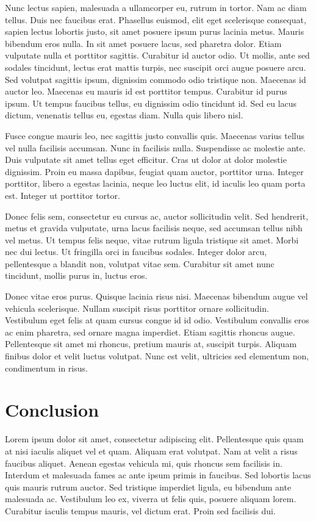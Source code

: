 \documentclass{UoYCSproject}
\begin{document}
Nunc lectus sapien, malesuada a ullamcorper eu, rutrum in tortor. Nam ac diam tellus. Duis nec faucibus erat. Phasellus euismod, elit eget scelerisque consequat, sapien lectus lobortis justo, sit amet posuere ipsum purus lacinia metus. Mauris bibendum eros nulla. In sit amet posuere lacus, sed pharetra dolor. Etiam vulputate nulla et porttitor sagittis. Curabitur id auctor odio. Ut mollis, ante sed sodales tincidunt, lectus erat mattis turpis, nec suscipit orci augue posuere arcu. Sed volutpat sagittis ipsum, dignissim commodo odio tristique non. Maecenas id auctor leo. Maecenas eu mauris id est porttitor tempus. Curabitur id purus ipsum. Ut tempus faucibus tellus, eu dignissim odio tincidunt id. Sed eu lacus dictum, venenatis tellus eu, egestas diam. Nulla quis libero nisl.

Fusce congue mauris leo, nec sagittis justo convallis quis. Maecenas varius tellus vel nulla facilisis accumsan. Nunc in facilisis nulla. Suspendisse ac molestie ante. Duis vulputate sit amet tellus eget efficitur. Cras ut dolor at dolor molestie dignissim. Proin eu massa dapibus, feugiat quam auctor, porttitor urna. Integer porttitor, libero a egestas lacinia, neque leo luctus elit, id iaculis leo quam porta est. Integer ut porttitor tortor.

Donec felis sem, consectetur eu cursus ac, auctor sollicitudin velit. Sed hendrerit, metus et gravida vulputate, urna lacus facilisis neque, sed accumsan tellus nibh vel metus. Ut tempus felis neque, vitae rutrum ligula tristique sit amet. Morbi nec dui lectus. Ut fringilla orci in faucibus sodales. Integer dolor arcu, pellentesque a blandit non, volutpat vitae sem. Curabitur sit amet nunc tincidunt, mollis purus in, luctus eros.

Donec vitae eros purus. Quisque lacinia risus nisi. Maecenas bibendum augue vel vehicula scelerisque. Nullam suscipit risus porttitor ornare sollicitudin. Vestibulum eget felis at quam cursus congue id id odio. Vestibulum convallis eros ac enim pharetra, sed ornare magna imperdiet. Etiam sagittis rhoncus augue. Pellentesque sit amet mi rhoncus, pretium mauris at, suscipit turpis. Aliquam finibus dolor et velit luctus volutpat. Nunc est velit, ultricies sed elementum non, condimentum in risus.


\chapter{Conclusion}
\label{cha:conclusion}
Lorem ipsum dolor sit amet, consectetur adipiscing elit. Pellentesque quis quam at nisi iaculis aliquet vel et quam. Aliquam erat volutpat. Nam at velit a risus faucibus aliquet. Aenean egestas vehicula mi, quis rhoncus sem facilisis in. Interdum et malesuada fames ac ante ipsum primis in faucibus. Sed lobortis lacus quis mauris rutrum auctor. Sed tristique imperdiet ligula, eu bibendum ante malesuada ac. Vestibulum leo ex, viverra ut felis quis, posuere aliquam lorem. Curabitur iaculis tempus mauris, vel dictum erat. Proin sed facilisis dui.
\end{document}
